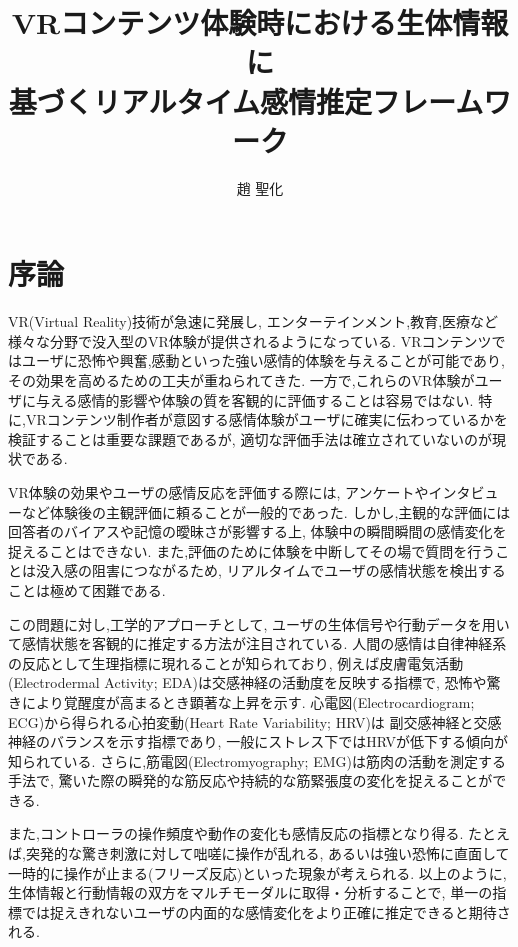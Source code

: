 \documentclass[book,paper=a4,fontsize=10pt,jafontscale=0.92]{jlreq}
\title{VRコンテンツ体験時における生体情報に\\基づくリアルタイム感情推定フレームワーク} %
\author{趙 聖化} %
\begin{document}

\jtitlepage %
\clearpage %
\jabstractpage %
\clearpage %
\tableofcontents %
\clearpage %
\listoftables %
\clearpage %
\listoffigures %
\clearpage %

\chapter{序論}

VR(Virtual Reality)技術が急速に発展し,
エンターテインメント,教育,医療など様々な分野で没入型のVR体験が提供されるようになっている.
VRコンテンツではユーザに恐怖や興奮,感動といった強い感情的体験を与えることが可能であり,
その効果を高めるための工夫が重ねられてきた.
一方で,これらのVR体験がユーザに与える感情的影響や体験の質を客観的に評価することは容易ではない.
特に,VRコンテンツ制作者が意図する感情体験がユーザに確実に伝わっているかを検証することは重要な課題であるが,
適切な評価手法は確立されていないのが現状である.

VR体験の効果やユーザの感情反応を評価する際には,
アンケートやインタビューなど体験後の主観評価に頼ることが一般的であった.
しかし,主観的な評価には回答者のバイアスや記憶の曖昧さが影響する上,
体験中の瞬間瞬間の感情変化を捉えることはできない.
また,評価のために体験を中断してその場で質問を行うことは没入感の阻害につながるため,
リアルタイムでユーザの感情状態を検出することは極めて困難である.

この問題に対し,工学的アプローチとして,
ユーザの生体信号や行動データを用いて感情状態を客観的に推定する方法が注目されている.
人間の感情は自律神経系の反応として生理指標に現れることが知られており,
例えば皮膚電気活動(Electrodermal Activity; EDA)は交感神経の活動度を反映する指標で,
恐怖や驚きにより覚醒度が高まるとき顕著な上昇を示す.
心電図(Electrocardiogram; ECG)から得られる心拍変動(Heart Rate Variability; HRV)は
副交感神経と交感神経のバランスを示す指標であり,
一般にストレス下ではHRVが低下する傾向が知られている.\cite{MarinMorales2020, OrozcoMora2024}
さらに,筋電図(Electromyography; EMG)は筋肉の活動を測定する手法で,
驚いた際の瞬発的な筋反応や持続的な筋緊張度の変化を捉えることができる.

また,コントローラの操作頻度や動作の変化も感情反応の指標となり得る.
たとえば,突発的な驚き刺激に対して咄嗟に操作が乱れる,
あるいは強い恐怖に直面して一時的に操作が止まる(フリーズ反応)といった現象が考えられる.
以上のように,生体情報と行動情報の双方をマルチモーダルに取得・分析することで,
単一の指標では捉えきれないユーザの内面的な感情変化をより正確に推定できると期待される.
\end{document}
